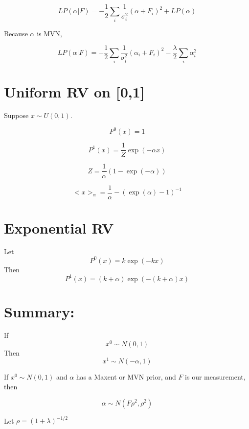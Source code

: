 \documentclass[12pt]{article}
\begin{document}
$$LP(\alpha|F) = -\frac{1}{2} \sum_i \frac{1}{\sigma_i^2}(\alpha + F_i)^2 + LP(\alpha)$$

Because $\alpha$ is MVN,

$$LP(\alpha|F) = -\frac{1}{2} \sum_i \frac{1}{\sigma_i^2}(\alpha_i + F_i)^2 - \frac{\lambda}{2} \sum_i \alpha_i^2$$

\section{Uniform RV on [0,1]}

Suppose $x \sim U(0,1)$.  

$$P^0(x) = 1$$

$$P^1(x) = \frac{1}{Z} \exp(-\alpha x)$$

$$Z = \frac{1}{\alpha} (1 - \exp(-\alpha))$$

$$<x>_\alpha = \frac{1}{\alpha} - (\exp(\alpha) - 1)^{-1}$$


\section{Exponential RV}
Let 
$$P^0(x) = k \exp(-k x)$$
Then
$$P^1(x) = (k + \alpha) \exp(-(k + \alpha) x)$$

\section{Summary:}

If 
$$x^0 \sim N(0,1)$$
Then
$$x^1 \sim N(-\alpha, 1)$$

If $x^0 \sim N(0,1)$ and  $\alpha$ has a Maxent or MVN prior, and $F$ is our measurement, then 

$$\alpha \sim N(F\rho^2, \rho^2)$$

Let $\rho = (1 + \lambda)^{-1 / 2}$
\end{document}

